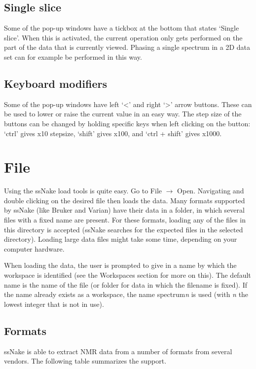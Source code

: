 \documentclass[11pt,a4paper]{article}
\begin{document}
\subsection{Single slice}
Some of the pop-up windows have a tickbox at the bottom that states `Single slice'. When this is
activated, the current operation only gets performed on the part of the data that is currently
viewed. Phasing a single spectrum in a 2D data set can for example be performed in this way.

\subsection{Keyboard modifiers}
Some of the pop-up windows have left `<' and right `>' arrow buttons. These can be used to lower or
raise the current value in an easy way. The step size of the buttons can be changed by holding
specific keys when left clicking on the button: `ctrl' gives x10 stepsize, `shift' gives x100, and
`ctrl + shift' gives x1000.


\section{File}
Using the ssNake load tools is quite easy. Go to File $\rightarrow$ Open. Navigating and double clicking on the desired file then loads the data. Many formats supported by ssNake (like Bruker and Varian) have their data in a folder, in which several files with a fixed name are present. For these formats, loading any of the files in this directory is accepted (ssNake searches for the expected files in the selected directory). Loading large data files might take some time, depending on your computer hardware.

When loading the data, the user is prompted to give in a name by which the workspace is identified (see the Workspaces section for more on this). The default name is the name of the file (or folder for data in which the filename is fixed). If the name already exists as a workspace, the name spectrum\textit{n} is used (with \textit{n} the lowest integer that is not in use).


\subsection{Formats}
ssNake is able to extract NMR data from a number of formats from several vendors. The following table summarizes the support.
\end{document}
